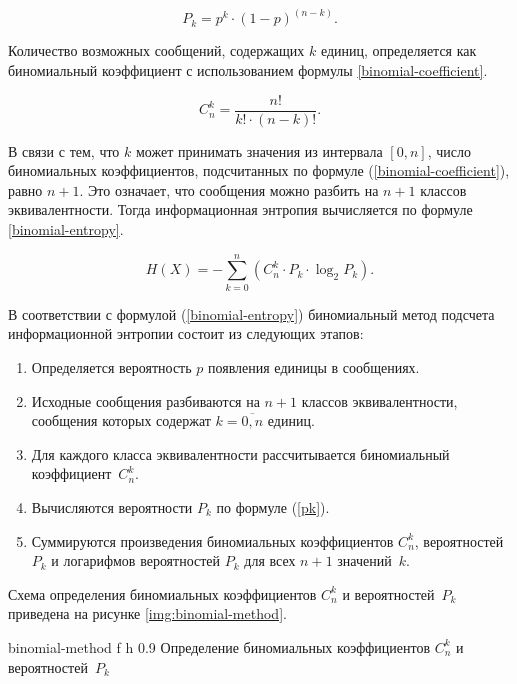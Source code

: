 \begin{equation}\label{pk}
	P_{k} = p^k \cdot (1 - p)^{(n - k)}.
\end{equation} 

Количество возможных сообщений, содержащих $k$ единиц, определяется как биномиальный коэффициент с использованием формулы \ref{binomial-coefficient}.

\begin{equation}\label{binomial-coefficient}
	C_{n}^k = \frac{n!}{k! \cdot (n - k)!}.
\end{equation}

В связи с тем, что $k$ может принимать значения из интервала $[0, n]$, число биномиальных коэффициентов, подсчитанных по формуле (\ref{binomial-coefficient}), равно $n + 1$. Это означает, что сообщения можно разбить на $n + 1$ классов эквивалентности. Тогда информационная энтропия вычисляется по формуле \ref{binomial-entropy}.

\begin{equation}\label{binomial-entropy}
	H(X) = -\sum_{k = 0}^n (C_{n}^k \cdot P_{k} \cdot \log_{2}P_{k}).
\end{equation}

В соответствии с формулой (\ref{binomial-entropy}) биномиальный метод подсчета информационной энтропии состоит из следующих этапов:

\begin{enumerate}
	\item Определяется вероятность $p$ появления единицы в сообщениях.
	\item Исходные сообщения разбиваются на $n + 1$ классов эквивалентности, сообщения которых содержат $k = \overline{0, n}$ единиц.
	\item Для каждого класса эквивалентности рассчитывается биномиальный коэффициент~$C_{n}^k$.
	\item Вычисляются вероятности $P_{k}$ по формуле (\ref{pk}).
	\item Суммируются произведения биномиальных коэффициентов $C_{n}^k$, вероятностей $P_{k}$ и логарифмов вероятностей $P_{k}$ для всех $n + 1$ значений~$k$.
\end{enumerate}

Схема определения биномиальных коэффициентов $C_{n}^k$ и вероятностей~$P_{k}$ приведена на рисунке \ref{img:binomial-method}.

    {binomial-method}
    {f}
    {h}
    {0.9\textwidth}
    {Определение биномиальных коэффициентов $C_{n}^k$ и вероятностей~$P_{k}$}

